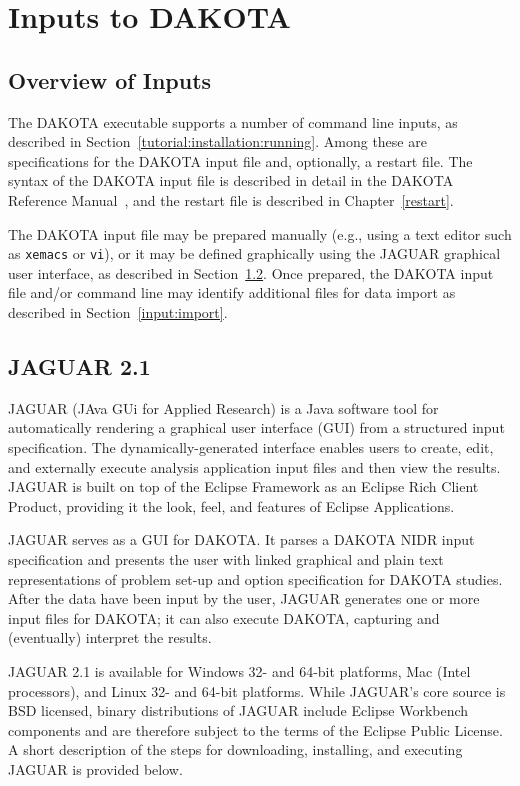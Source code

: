\chapter{Inputs to DAKOTA}\label{input}

\section{Overview of Inputs}\label{input:overview}

The DAKOTA executable supports a number of command line inputs, as
described in Section~\ref{tutorial:installation:running}.  Among
these are specifications for the DAKOTA input file and, optionally, a
restart file.  The syntax of the DAKOTA input file is described in detail 
in the DAKOTA Reference Manual~\cite{RefMan}, and the restart file is
described in Chapter~\ref{restart}.

The DAKOTA input file may be prepared manually (e.g., using a text
editor such as \texttt{xemacs} or \texttt{vi}), or it may be defined
graphically using the JAGUAR graphical user interface, as described in
Section~\ref{input:gui}.  Once prepared, the DAKOTA input file and/or
command line may identify additional files for data import as
described in Section~\ref{input:import}.

\section{JAGUAR 2.1}\label{input:gui}

JAGUAR (JAva GUi for Applied Research) is a Java software tool for
automatically rendering a graphical user interface (GUI) from a
structured input specification.  The dynamically-generated interface
enables users to create, edit, and externally execute analysis
application input files and then view the results.  JAGUAR is built on
top of the Eclipse Framework \cite{Eclipse} as an Eclipse Rich
Client Product, providing it the look, feel, and features of Eclipse
Applications.

JAGUAR serves as a GUI for DAKOTA.  It parses a DAKOTA NIDR input
specification and presents the user with linked graphical and plain
text representations of problem set-up and option specification for
DAKOTA studies. After the data have been input by the user, JAGUAR
generates one or more input files for DAKOTA; it can also execute
DAKOTA, capturing and (eventually) interpret the results.

JAGUAR 2.1 is available for Windows 32- and 64-bit platforms, 
Mac (Intel processors), and Linux 32- and 64-bit platforms. 
While JAGUAR's core source is BSD licensed,
binary distributions of JAGUAR include Eclipse Workbench components
and are therefore subject to the terms of the Eclipse Public License.
A short description of the steps for downloading, installing, and
executing JAGUAR is provided below.


